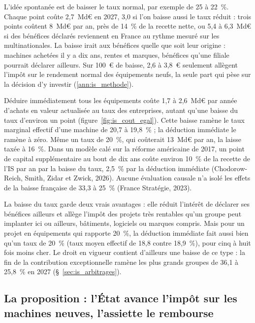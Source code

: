 L'idée spontanée est de baisser le taux normal, par exemple de 25 à 22~\%. Chaque point coûte 2,7~Md€ en 2027, 3,0 si
l'on baisse aussi le taux réduit : trois points coûtent 8~Md€ par an, près de 14~\% de la recette nette, ou 5,4 à
6,3~Md€ si des bénéfices déclarés reviennent en France au rythme mesuré sur les multinationales. La baisse irait aux
bénéfices quelle que soit leur origine : machines achetées il y a dix ans, rentes et marques, bénéfices qu'une filiale
pourrait déclarer ailleurs. Sur 100~€ de baisse, 2,6 à 3,8~€ seulement allègent l'impôt sur le rendement normal des
équipements neufs, la seule part qui pèse sur la décision d'y investir (\ref{ann:is_methode}).

Déduire immédiatement tous les équipements coûte 1,7 à 2,6~Md€ par année d'achats en valeur actualisée au taux des entreprises, autant
qu'une baisse du taux d'environ un point (figure~\ref{fig:is_cout_egal}). Cette baisse ramène le taux marginal effectif d'une machine de 20,7 à 19,8~\% ; la déduction immédiate le ramène
à zéro. Même un taux de 20~\%, qui coûterait 13~Md€ par an, la laisse taxée à 16~\%. Dans un modèle calé sur la
réforme américaine de 2017, un point de capital supplémentaire au bout de dix ans coûte environ 10~\% de la recette de
l'IS par an par la baisse du taux, 2,5~\% par la déduction immédiate (Chodorow-Reich, Smith, Zidar et Zwick, 2026).
Aucune évaluation causale n'a isolé les effets de la baisse française de 33,3 à 25~\% (France Stratégie, 2023).


La baisse du taux garde deux vrais avantages : elle réduit l'intérêt de déclarer ses bénéfices ailleurs et allège
l'impôt des projets très rentables qu'un groupe peut implanter ici ou ailleurs, bâtiments, logiciels ou marques
compris. Mais pour un projet en équipements qui rapporte 20~\%, la déduction immédiate fait aussi bien qu'un taux de
20~\% (taux moyen effectif de 18,8 contre 18,9~\%), pour cinq à huit fois moins cher. Le droit en vigueur contient
d'ailleurs une baisse de ce type : la fin de la contribution exceptionnelle ramène les plus grands groupes de 36,1 à
25,8~\% en 2027 (§~\ref{sec:is_arbitrages}).

\subsection{La proposition : l'État avance l'impôt sur les machines neuves, l'assiette le rembourse}\label{sec:is_prop}

